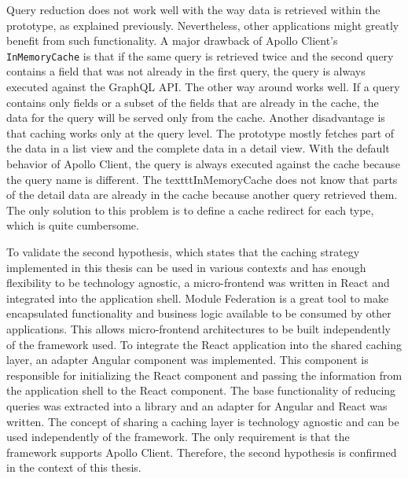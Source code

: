 \bigskip

\noindent Query reduction does not work well with the way data is retrieved within the prototype, as explained previously. Nevertheless, other applications might greatly benefit from such functionality. A major drawback of Apollo Client's \texttt{InMemoryCache} is that if the same query is retrieved twice and the second query contains a field that was not already in the first query, the query is always executed against the GraphQL \ac{API}. The other way around works well. If a query contains only fields or a subset of the fields that are already in the cache, the data for the query will be served only from the cache. Another disadvantage is that caching works only at the query level. The prototype mostly fetches part of the data in a list view and the complete data in a detail view. With the default behavior of Apollo Client, the query is always executed against the cache because the query name is different. The texttt{InMemoryCache} does not know that parts of the detail data are already in the cache because another query retrieved them. The only solution to this problem is to define a cache redirect for each type, which is quite cumbersome.

\bigskip

\noindent To validate the second hypothesis, which states that the caching strategy implemented in this thesis can be used in various contexts and has enough flexibility to be technology agnostic, a micro-frontend was written in React and integrated into the application shell. Module Federation is a great tool to make encapsulated functionality and business logic available to be consumed by other applications. This allows micro-frontend architectures to be built independently of the framework used. To integrate the React application into the shared caching layer, an adapter Angular component was implemented. This component is responsible for initializing the React component and passing the information from the application shell to the React component. The base functionality of reducing queries was extracted into a library and an adapter for Angular and React was written. The concept of sharing a caching layer is technology agnostic and can be used independently of the framework. The only requirement is that the framework supports Apollo Client. Therefore, the second hypothesis is confirmed in the context of this thesis.
